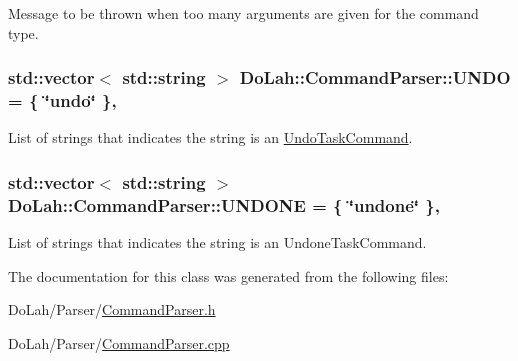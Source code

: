 Message to be thrown when too many arguments are given for the command type. 

\hypertarget{class_do_lah_1_1_command_parser_a45a95546b7799a8107e53b2f9b06b832}{}
\subsubsection[{U\+N\+D\+O}]{\setlength{\rightskip}{0pt plus 5cm}std\+::vector$<$ std\+::string $>$ Do\+Lah\+::\+Command\+Parser\+::\+U\+N\+D\+O = \{ \char`\"{}undo\char`\"{} \}\hspace{0.3cm}{\ttfamily [static]}, {\ttfamily [private]}}\label{class_do_lah_1_1_command_parser_a45a95546b7799a8107e53b2f9b06b832}


List of strings that indicates the string is an \hyperlink{class_do_lah_1_1_undo_task_command}{Undo\+Task\+Command}. 

\hypertarget{class_do_lah_1_1_command_parser_ad58f7d1620e3c60fc85850183804443a}{}
\subsubsection[{U\+N\+D\+O\+N\+E}]{\setlength{\rightskip}{0pt plus 5cm}std\+::vector$<$ std\+::string $>$ Do\+Lah\+::\+Command\+Parser\+::\+U\+N\+D\+O\+N\+E = \{ \char`\"{}undone\char`\"{} \}\hspace{0.3cm}{\ttfamily [static]}, {\ttfamily [private]}}\label{class_do_lah_1_1_command_parser_ad58f7d1620e3c60fc85850183804443a}


List of strings that indicates the string is an Undone\+Task\+Command. 



The documentation for this class was generated from the following files\+:\begin{DoxyCompactItemize}
\item 
Do\+Lah/\+Parser/\hyperlink{_command_parser_8h}{Command\+Parser.\+h}\item 
Do\+Lah/\+Parser/\hyperlink{_command_parser_8cpp}{Command\+Parser.\+cpp}\end{DoxyCompactItemize}
